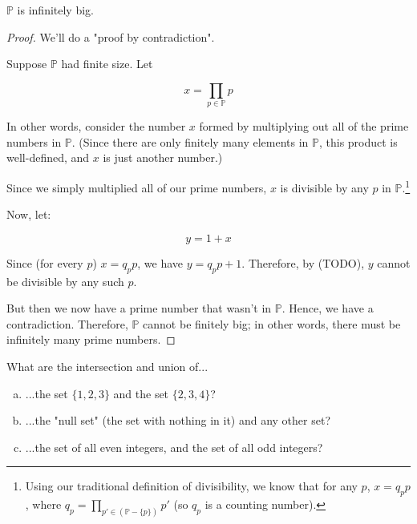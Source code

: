 \begin{theorem}
$\mathbb{P}$ is infinitely big. 
\end{theorem}
\begin{proof}
We'll do a "proof by contradiction". %

Suppose $\mathbb{P}$ had finite size. Let

\begin{equation*}
x = \prod_{p \in \mathbb{P}} p
\end{equation*}

In other words, consider the number $x$ formed by multiplying out all of the prime numbers in $\mathbb{P}$. (Since there are only finitely many elements in $\mathbb{P}$, this product is well-defined, and $x$ is just another number.) 

Since we simply multiplied all of our prime numbers, $x$ is divisible by any $p$ in $\mathbb{P}$.\footnote{Using our traditional definition of divisibility, we know that for any $p$, $x = q_p p$, where $q_p = \prod_{p' \in (\mathbb{P} - \{p\})} p'$ (so $q_p$ is a counting number).}

Now, let:

\begin{equation*}
y = 1 + x
\end{equation*}

Since (for every $p$) $x = q_p p$, we have $y = q_p p + 1$. Therefore, by (TODO), $y$ cannot be divisible by any such $p$.

But then we now have a prime number that wasn't in $\mathbb{P}$. Hence, we have a contradiction. Therefore, $\mathbb{P}$ cannot be finitely big; in other words, there must be infinitely many prime numbers.
\end{proof}




\newpage

\begin{exercise}
What are the intersection and union of...
\begin{enumerate}[(a)]
\item ...the set $\{1, 2, 3\}$ and the set $\{2, 3, 4\}$?
\item ...the "null set" (the set with nothing in it) and any other set?
\item ...the set of all even integers, and the set of all odd integers?
\end{enumerate}
\end{exercise}

